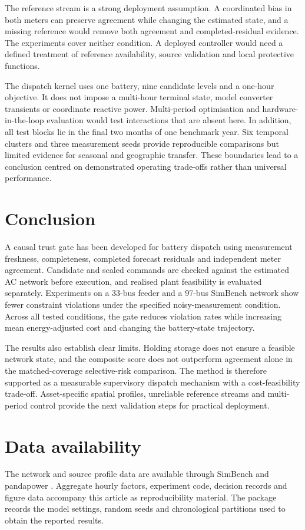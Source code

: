 \documentclass[11pt,a4paper]{article}
\begin{document}
The reference stream is a strong deployment assumption. A coordinated bias in both meters can preserve agreement while changing the estimated state, and a missing reference would remove both agreement and completed-residual evidence. The experiments cover neither condition. A deployed controller would need a defined treatment of reference availability, source validation and local protective functions.

The dispatch kernel uses one battery, nine candidate levels and a one-hour objective. It does not impose a multi-hour terminal state, model converter transients or coordinate reactive power. Multi-period optimisation and hardware-in-the-loop evaluation would test interactions that are absent here. In addition, all test blocks lie in the final two months of one benchmark year. Six temporal clusters and three measurement seeds provide reproducible comparisons but limited evidence for seasonal and geographic transfer. These boundaries lead to a conclusion centred on demonstrated operating trade-offs rather than universal performance.


\section{Conclusion}\label{sec:conclusion}
A causal trust gate has been developed for battery dispatch using measurement freshness, completeness, completed forecast residuals and independent meter agreement. Candidate and scaled commands are checked against the estimated AC network before execution, and realised plant feasibility is evaluated separately. Experiments on a 33-bus feeder and a 97-bus SimBench network show fewer constraint violations under the specified noisy-measurement condition. Across all tested conditions, the gate reduces violation rates while increasing mean energy-adjusted cost and changing the battery-state trajectory.

The results also establish clear limits. Holding storage does not ensure a feasible network state, and the composite score does not outperform agreement alone in the matched-coverage selective-risk comparison. The method is therefore supported as a measurable supervisory dispatch mechanism with a cost-feasibility trade-off. Asset-specific spatial profiles, unreliable reference streams and multi-period control provide the next validation steps for practical deployment.

\section*{Data availability}
The network and source profile data are available through SimBench and pandapower \cite{meinecke,thurner}. Aggregate hourly factors, experiment code, decision records and figure data accompany this article as reproducibility material. The package records the model settings, random seeds and chronological partitions used to obtain the reported results.
\end{document}
